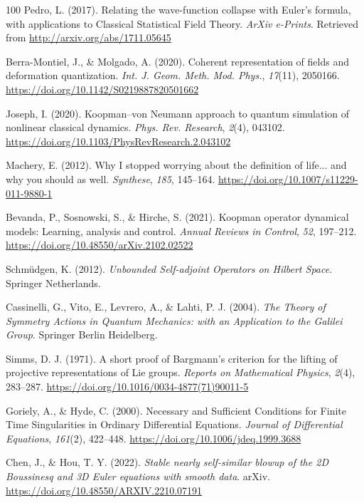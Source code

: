 \documentclass[11pt]{book}
\begin{document}
\begin{thebibliography}{100}
 Pedro, L. (2017). Relating the wave-function collapse with Euler's
formula, with applications to Classical Statistical Field Theory.
\emph{ArXiv e-Prints}. Retrieved from
\url{http://arxiv.org/abs/1711.05645}

 Berra-Montiel, J., \& Molgado, A. (2020). Coherent representation of
fields and deformation quantization. \emph{Int. J. Geom. Meth. Mod.
Phys.}, \emph{17}(11), 2050166.
\url{https://doi.org/10.1142/S0219887820501662}

 Joseph, I. (2020). Koopman--von Neumann approach to quantum simulation
of nonlinear classical dynamics. \emph{Phys. Rev. Research},
\emph{2}(4), 043102.
\url{https://doi.org/10.1103/PhysRevResearch.2.043102}

 Machery, E. (2012). Why I stopped worrying about the definition of
life... and why you should as well. \emph{Synthese}, \emph{185},
145--164. \url{https://doi.org/10.1007/s11229-011-9880-1}

 Bevanda, P., Sosnowski, S., \& Hirche, S. (2021). Koopman operator
dynamical models: Learning, analysis and control. \emph{Annual Reviews
in Control}, \emph{52}, 197--212.
\url{https://doi.org/10.48550/arXiv.2102.02522}

 Schmüdgen, K. (2012). \emph{Unbounded Self-adjoint Operators on Hilbert
Space}. Springer Netherlands.

 Cassinelli, G., Vito, E., Levrero, A., \& Lahti, P. J. (2004). \emph{The
Theory of Symmetry Actions in Quantum Mechanics: with an Application to
the Galilei Group}. Springer Berlin Heidelberg.

 Simms, D. J. (1971). A short proof of Bargmann's criterion for the
lifting of projective representations of Lie groups. \emph{Reports on
Mathematical Physics}, \emph{2}(4), 283--287.
\url{https://doi.org/10.1016/0034-4877(71)90011-5}

 Goriely, A., \& Hyde, C. (2000). Necessary and Sufficient Conditions for
Finite Time Singularities in Ordinary Differential Equations.
\emph{Journal of Differential Equations}, \emph{161}(2), 422--448.
\url{https://doi.org/10.1006/jdeq.1999.3688}

 Chen, J., \& Hou, T. Y. (2022). \emph{Stable nearly self-similar blowup
of the 2D Boussinesq and 3D Euler equations with smooth data}. arXiv.
\url{https://doi.org/10.48550/ARXIV.2210.07191}


\end{thebibliography}
\end{document}
